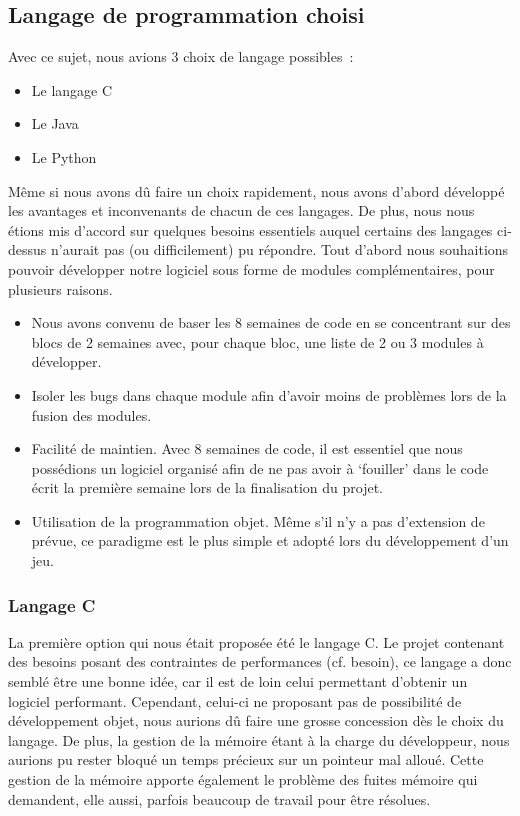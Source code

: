 \documentclass{article}
\begin{document}
\subsection{Langage de programmation choisi}
Avec ce sujet, nous avions 3 choix de langage possibles :
\begin{itemize}
    \item Le langage C
    \item Le Java
    \item Le Python
\end{itemize}
Même si nous avons dû faire un choix rapidement, nous avons d'abord développé les
avantages et inconvenants de chacun de ces langages. De plus, nous nous étions mis
d'accord sur quelques besoins essentiels auquel certains des langages ci-dessus 
n'aurait pas (ou difficilement) pu répondre.
Tout d'abord nous souhaitions pouvoir développer notre logiciel sous forme de modules
complémentaires, pour plusieurs raisons.
\begin{itemize}
    \item Nous avons convenu de baser les 8 semaines de code en se concentrant sur 
    des blocs de 2 semaines avec, pour chaque bloc, une liste de 2 ou 3 modules à développer.
    \item Isoler les bugs dans chaque module afin d'avoir moins de problèmes lors de la fusion
    des modules.
    \item Facilité de maintien. Avec 8 semaines de code, il est essentiel que nous possédions
    un logiciel organisé afin de ne pas avoir à `fouiller' dans le code écrit la première semaine
    lors de la finalisation du projet.
    \item Utilisation de la programmation objet. Même s'il n'y a pas d'extension de prévue,
    ce paradigme est le plus simple et adopté lors du développement d'un jeu.
\end{itemize}

\subsubsection{Langage C}
La première option qui nous était proposée été le langage C. Le projet contenant des besoins posant
des contraintes de performances (cf. besoin), ce langage a donc semblé être une bonne idée, car il est
de loin celui permettant d'obtenir un logiciel performant. Cependant, celui-ci ne proposant pas de 
possibilité de développement objet, nous aurions dû faire une grosse concession dès le choix du langage.
De plus, la gestion de la mémoire étant à la charge du développeur, nous aurions pu rester bloqué un temps
précieux sur un pointeur mal alloué. Cette gestion de la mémoire apporte également le problème des fuites
mémoire qui demandent, elle aussi, parfois beaucoup de travail pour être résolues.
\end{document}
